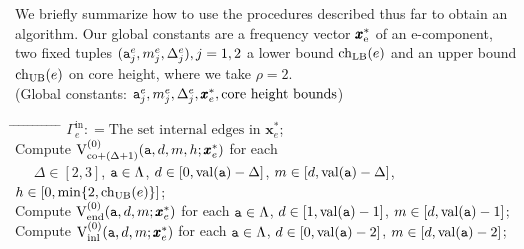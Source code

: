 \documentclass[12pt]{article}
\newcommand{\inn}{\mathrm{in}}
\newcommand{\co}{\mathrm{co}}
\newcommand{\V}{{\rm V}}
\newcommand{\ta}{{\tt a}}
\newcommand{\x}{\pmb{x}}
\newcommand{\1}{\pmb{1}}
\newcommand{\0}{\pmb{0}}
\newcommand{\val}{\mathrm{val}}
\newcommand{\inl}{\mathrm{inl}}
\newcommand{\en}{\mathrm{end}}
\begin{document}
We briefly summarize how to use the procedures described thus far 
to obtain an algorithm.
Our global constants are a frequency vector $\x^*_{\rm e}$ of an e-component, 
two fixed tuples $(\ta^e_j, m^e_j, \Delta^e_j), j = 1, 2$
a lower bound 
${\rm ch}_{{\rm LB}}(e)$ and an upper bound
${\rm ch}_{{\rm UB}}(e)$ on core height, where we take 
$\rho = 2$. \bigskip\\
%
(Global constants: 
$\ta^e_j, m^e_j, \Delta^e_j, \x^*_e, {\rm core~height~bounds}$)
\begin{tabbing}
%
\hspace{3mm} \= \hspace{3mm} \= \hspace{3mm} \= \hspace{3mm} \= %
\hspace{3mm} \= \hspace{3mm} \= \hspace{3mm} \= \hspace{3mm} \= %
\hspace{3mm} \= \hspace{3mm} \= \hspace{3mm} \= \hspace{3mm}  \kill
$\Gamma^{\inn}_e: = \text{The set internal edges in 
	$\x^*_e$}$;\\
Compute $\V^{(0)}_{\co + (\Delta+1)}
	(\ta, d, m, h; \x_e^*)$ for each \\
		~~
		$\Delta \in [2,3]$, 
		$\ta \in \Lambda$, $d \in [0, \val(\ta)-\Delta]$,
		$m \in [d, \val(\ta) -\Delta]$, 
	$h \in [0, 	\min \{2, {\rm ch}_{{\rm UB}}(e)  \} ]$;\\
	Compute 
	$\V_{\en}^{(0)}(\ta, d, m; \x^*_e)$ for each 
	$\ta \in \Lambda$, $d \in [1, \val(\ta)-1]$,
 	$m \in [d, \val(\ta)-1]$;\\
	Compute $\V_{\inl}^{(0)}(\ta, d, m; \x^*_e)$ for each 
	$\ta \in \Lambda$, $d \in [0, \val(\ta)-2]$, 
	$m \in [d, \val(\ta)-2]$;\\
	

\end{tabbing}
\end{document}
